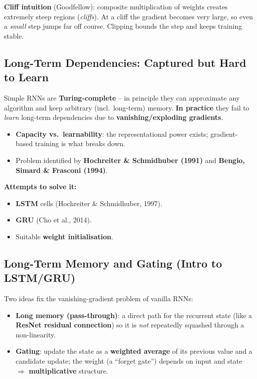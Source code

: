 \documentclass[10pt,a4paper]{article}
\begin{document}
	\begin{importantbox}
		\textbf{Cliff intuition} (Goodfellow): composite multiplication of weights creates extremely steep regions (\emph{cliffs}). At a cliff the gradient becomes very large, so even a \emph{small} step jumps far off course. Clipping bounds the step and keeps training stable.
	\end{importantbox}

	\subsection{Long-Term Dependencies: Captured but Hard to Learn}

	\begin{importantbox}
		Simple RNNs are \textbf{Turing-complete} -- in principle they can approximate any algorithm and keep arbitrary (incl.\ long-term) memory. \textbf{In practice} they fail to \emph{learn} long-term dependencies due to \textbf{vanishing/exploding gradients}.
	\end{importantbox}

	\begin{itemize}[leftmargin=*]
		\item \textbf{Capacity vs.\ learnability}: the representational power exists; gradient-based training is what breaks down.
		\item Problem identified by \textbf{Hochreiter \& Schmidhuber (1991)} and \textbf{Bengio, Simard \& Frasconi (1994)}.
	\end{itemize}

	\textbf{Attempts to solve it:}
	\begin{itemize}[leftmargin=*]
		\item \textbf{LSTM} cells (Hochreiter \& Schmidhuber, 1997).
		\item \textbf{GRU} (Cho et al., 2014).
		\item Suitable \textbf{weight initialisation}.
	\end{itemize}

	\subsection{Long-Term Memory and Gating (Intro to LSTM/GRU)}

	\begin{definitionbox}
		Two ideas fix the vanishing-gradient problem of vanilla RNNs:
		\begin{itemize}[leftmargin=*]
			\item \textbf{Long memory (pass-through)}: a direct path for the recurrent state (like a \textbf{ResNet residual connection}) so it is \emph{not} repeatedly squashed through a non-linearity.
			\item \textbf{Gating}: update the state as a \textbf{weighted average} of its previous value and a candidate update; the weight (a ``forget gate'') depends on input and state $\Rightarrow$ \textbf{multiplicative} structure.
		\end{itemize}
	\end{definitionbox}
\end{document}
